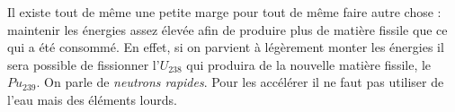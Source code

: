 Il existe tout de même une petite marge pour tout de même faire autre chose : maintenir les énergies 
assez élevée afin de produire plus de matière fissile que ce qui a été consommé. En effet, si on 
parvient à légèrement monter les énergies il sera possible de fissionner l'$U_{238}$ qui produira 
de la nouvelle matière fissile, le $Pu_{239}$. On parle de \textit{neutrons rapides}. Pour les 
accélérer il ne faut pas utiliser de l'eau mais des éléments lourds.

